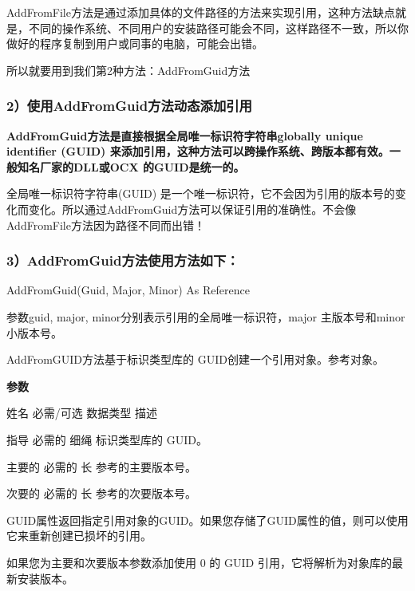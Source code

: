 \documentclass[
]{article}
\newenvironment{Shaded}{}{}
\newcommand{\NormalTok}[1]{#1}
\begin{document}
AddFromFile方法是通过添加具体的文件路径的方法来实现引用，这种方法缺点就是，不同的操作系统、不同用户的安装路径可能会不同，这样路径不一致，所以你做好的程序复制到用户或同事的电脑，可能会出错。

所以就要用到我们第2种方法：AddFromGuid方法

\subsubsection{\texorpdfstring{\textbf{2）使用AddFromGuid方法动态添加引用}}{2）使用AddFromGuid方法动态添加引用}}\label{2uxff09ux4f7fux7528addfromguidux65b9ux6cd5ux52a8ux6001ux6dfbux52a0ux5f15ux7528}

\textbf{AddFromGuid方法是直接根据全局唯一标识符字符串globally unique
identifier (GUID)
来添加引用，这种方法可以跨操作系统、跨版本都有效。一般知名厂家的DLL或OCX
的GUID是统一的。}

全局唯一标识符字符串(GUID)
是一个唯一标识符，它不会因为引用的版本号的变化而变化。所以通过AddFromGuid方法可以保证引用的准确性。不会像AddFromFile方法因为路径不同而出错！

\subsubsection{\texorpdfstring{\textbf{3）AddFromGuid方法使用方法如下：}}{3）AddFromGuid方法使用方法如下：}}\label{3uxff09addfromguidux65b9ux6cd5ux4f7fux7528ux65b9ux6cd5ux5982ux4e0b}

\begin{Shaded}
\begin{Highlighting}[]
\NormalTok{AddFromGuid(Guid, Major, Minor) As Reference}
\end{Highlighting}
\end{Shaded}

参数guid, major, minor分别表示引用的全局唯一标识符，major
主版本号和minor 小版本号。

AddFromGUID方法基于标识类型库的 GUID创建一个引用对象。参考对象。

\textbf{参数}

姓名 必需/可选 数据类型 描述

指导 必需的 细绳 标识类型库的 GUID。

主要的 必需的 长 参考的主要版本号。

次要的 必需的 长 参考的次要版本号。

GUID属性返回指定引用对象的GUID。如果您存储了GUID属性的值，则可以使用它来重新创建已损坏的引用。

如果您为主要和次要版本参数添加使用 0 的 GUID
引用，它将解析为对象库的最新安装版本。
\end{document}
